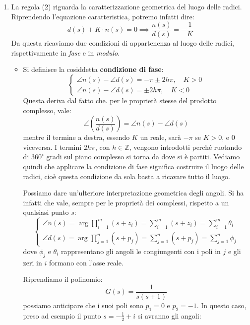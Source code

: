 \documentclass[a4paper,11pt]{article}
\begin{document}
\begin{enumerate}
	\item	
		La regola (2) riguarda la caratterizzazione geometrica del luogo delle radici. Riprendendo l'equazione caratteristica, potremo infatti dire:
		$$
		d(s) + K \cdot n(s) = 0 \implies \frac{n(s)}{d(s)} = -\frac{1}{K}
		$$
		Da questa ricaviamo due condizioni di appartenenza al luogo delle radici, rispettivamente in \textit{fase} e in \textit{modulo}.
		\begin{itemize}
			\item 
				Si definisce la cosiddetta \textbf{condizione di fase}:
				\[
					\begin{cases}
						\angle n(s) - \angle d(s) = -\pi \pm 2 h \pi, \quad K > 0 \\
						\angle n(s) - \angle d(s) = \pm 2 h \pi, \quad K < 0
					\end{cases}
				\]
				Questa deriva dal fatto che. per le proprietà stesse del prodotto complesso, vale:
				$$
				\angle \left( \frac{n(s)}{d(s)} \right) = \angle n(s) - \angle d(s)
				$$
				mentre il termine a destra, essendo $K$ un reale, sarà $-\pi$ se $K > 0$, e $0$ viceversa.
				I termini $2 h \pi$, con $h \in \mathbb{Z}$, vengono introdotti perché ruotando di $360^\circ$ gradi sul piano complesso si torna da dove si è partiti.
				Vediamo quindi che applicare la condizione di fase significa costruire il luogo delle radici, cioè questa condizione da sola basta a ricavare tutto il luogo.

				Possiamo dare un'ulteriore interpretazione geometrica degli angoli.
				Si ha infatti che vale, sempre per le proprietà dei complessi, rispetto a un qualsiasi punto $s$:
				\[
					\begin{cases}
						\angle n(s) = \arg \prod_{i = 1}^m (s + z_i) = \sum_{i = 1}^m (s + z_i) = \sum_{i = 1}^m \theta_i \\ 
						\angle d(s) = \arg \prod_{j = 1}^n (s + p_j) = \sum_{j = 1}^n (s + p_j) = \sum_{j = 1}^n \phi_j 
					\end{cases}
				\]
				dove $\phi_j$ e $\theta_i$ rappresentano gli angoli le congiungenti con i poli in $j$ e gli zeri in $i$ formano con l'asse reale. 

				\par\medskip
				\noindent
				\textbf{}

				Riprendiamo il polinomio:
				$$
				G(s) = \frac{1}{s (s + 1)}
				$$
				possiamo anticipare che i suoi poli sono $p_1 = 0$ e $p_2 = -1$.
				In questo caso, preso ad esempio il punto $s = -\frac{1}{2} + i$ si avranno gli angoli:


\end{itemize}
\end{enumerate}
\end{document}

